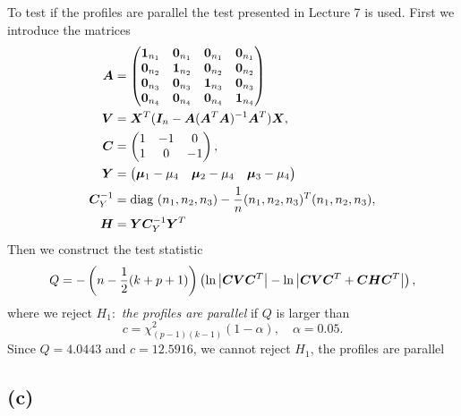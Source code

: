 To test if the profiles are parallel the test presented in Lecture
7 is used. First we introduce the matrices
\begin{align*}
  \bm{A} &=
         \begin{pmatrix}
           \bm{1}_{n_{1}}  & \bm{0}_{n_{1}}& \bm{0}_{n_{1}}& \bm{0}_{n_{1}} \\
           \bm{0}_{n_{2}} &  \bm{1}_{n_{2}}  &\bm{0}_{n_{2}}& \bm{0}_{n_{2}} \\
           \bm{0}_{n_{3}}& \bm{0}_{n_{3}}&  \bm{1}_{n_{3}}  & \bm{0}_{n_{3}} \\
           \bm{0}_{n_{4}}& \bm{0}_{n_{4}}& \bm{0}_{n_{4}} &   \bm{1}_{n_{4}}   \\ 
         \end{pmatrix} \\
  \bm{V} &= \bm{X}^{T} (\bm{I}_{n}   -  \bm{A}(\bm{A}^{T}\bm{A})^{-1}\bm{A}^{T}) \bm{X}, \\
  \bm{C} &=
         \begin{pmatrix}
           1 & -1 & 0 \\
           1 &  0 & -1
         \end{pmatrix}, \\
  \bm{Y} &=
         \begin{pmatrix}
           \bm{\mu}_{1} - \mu_{4} &\bm{\mu}_{2} - \mu_{4} &\bm{\mu}_{3} - \mu_{4} 
         \end{pmatrix} \\
  \bm{C}_{Y}^{-1} &= \text{diag } (n_{1}, n_{2}, n_{3}) - \frac{1}{n}   (n_{1},
                  n_{2}, n_{3})^{T} (n_{1}, n_{2}, n_{3}), \\
  \bm{H} &= \bm{Y}\bm{C}_{Y}^{-1}\bm{Y}^{T}                  
\end{align*}
Then we construct the test statistic
\begin{equation*}
  Q = -
  \left(
    n - \frac{1}{2}(k + p + 1)
  \right)
  \left(
    \ln \left| \bm{CVC}^{T} \right| - \ln \left| \bm{CVC}^{T} + \bm{CHC}^{T} \right|
  \right) ,
\end{equation*}
where we reject $H_{1}: $ \textit{the profiles are parallel} if $Q$ is larger
than 
\begin{equation*}
  c = \chi^{2}_{(p-1)(k-1)}(1 - \alpha), \quad \alpha = 0.05.
\end{equation*}
Since $Q =4.0443 $ and $c = 12.5916$, we cannot reject $H_{1}$, the
profiles are parallel


\subsection*{(c)}
\label{sec:c-2}

